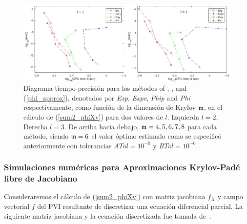 \begin{figure}[ht]
	\includegraphics[scale=0.55]{Graphics/phil2l3.jpg}
	\caption{Diagrama tiempo-precisión para los métodos of \cite{hochbruck1997krylov}, \cite{sidje1998expokit}, \cite{niesen2012algorithm} and (\ref{phi_approx}), denotados por \textit{Exp}, \textit{Expv}, \textit{Phip} and \textit{Phi} respectivamente, como función de la dimensión de Krylov $\mathfrak{m}$, en el cálculo de  (\ref{sum2_phiXv}) para dos valores de $l$. Izquierda $l=2$, Derecha $l=3$. De arriba hacia debajo, $\mathfrak{m}=4,5,6,7,8$ para cada método, siendo $\mathfrak{m}=6$ el valor óptimo estimado como se especificó anteriormente con tolerancias $ATol=10^{-9}$ y $RTol=10^{-6}$.}
	\label{fig:SumPhi}
\end{figure}

\subsubsection{Simulaciones numéricas para Aproximaciones Krylov-Padé libre de Jacobiano}
Consideraremos el cálculo de (\ref{sum2_phiXv}) con matriz jacobiana $f_X$ y campo vectorial $f$ del PVI resultante de discretizar una ecuación diferencial parcial. La siguiente matriz jacobiana y la ecuación discretizada fue tomada de~\cite{tokman2006efficient}.

